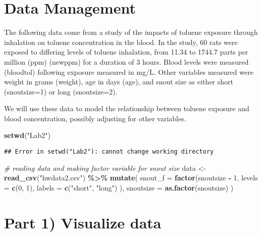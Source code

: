 \documentclass[
]{article}
\newenvironment{Shaded}{\begin{snugshade}}{\end{snugshade}}
\newcommand{\AttributeTok}[1]{\textcolor[rgb]{0.13,0.29,0.53}{#1}}
\newcommand{\CommentTok}[1]{\textcolor[rgb]{0.56,0.35,0.01}{\textit{#1}}}
\newcommand{\DecValTok}[1]{\textcolor[rgb]{0.00,0.00,0.81}{#1}}
\newcommand{\FunctionTok}[1]{\textcolor[rgb]{0.13,0.29,0.53}{\textbf{#1}}}
\newcommand{\NormalTok}[1]{#1}
\newcommand{\OtherTok}[1]{\textcolor[rgb]{0.56,0.35,0.01}{#1}}
\newcommand{\SpecialCharTok}[1]{\textcolor[rgb]{0.81,0.36,0.00}{\textbf{#1}}}
\newcommand{\StringTok}[1]{\textcolor[rgb]{0.31,0.60,0.02}{#1}}
\begin{document}
\section{Data Management}\label{data-management}

The following data come from a study of the impacts of toluene exposure
through inhalation on toluene concentration in the blood. In the study,
60 rats were exposed to differing levels of toluene inhalation, from
11.34 to 1744.7 parts per million (ppm) (newppm) for a duration of 3
hours. Blood levels were measured (bloodtol) following exposure measured
in mg/L. Other variables measured were weight in grams (weight), age in
days (age), and snout size as either short (snoutsize=1) or long
(snoutsize=2).

We will use these data to model the relationship between toluene
exposure and blood concentration, possibly adjusting for other
variables.

\begin{Shaded}
\begin{Highlighting}[]
\FunctionTok{setwd}\NormalTok{(}\StringTok{"Lab2"}\NormalTok{)}
\end{Highlighting}
\end{Shaded}

\begin{verbatim}
## Error in setwd("Lab2"): cannot change working directory
\end{verbatim}

\begin{Shaded}
\begin{Highlighting}[]
\CommentTok{\# reading data and making factor variable for snout size}
\NormalTok{data }\OtherTok{\textless{}{-}} \FunctionTok{read\_csv}\NormalTok{(}\StringTok{"hwdata2.csv"}\NormalTok{) }\SpecialCharTok{\%\textgreater{}\%}
  \FunctionTok{mutate}\NormalTok{(}
    \AttributeTok{snout\_f =} \FunctionTok{factor}\NormalTok{(snoutsize }\SpecialCharTok{{-}} \DecValTok{1}\NormalTok{,}
      \AttributeTok{levels =} \FunctionTok{c}\NormalTok{(}\DecValTok{0}\NormalTok{, }\DecValTok{1}\NormalTok{),}
      \AttributeTok{labels =} \FunctionTok{c}\NormalTok{(}\StringTok{"short"}\NormalTok{, }\StringTok{"long"}\NormalTok{)}
\NormalTok{    ),}
    \AttributeTok{snoutsize =} \FunctionTok{as.factor}\NormalTok{(snoutsize)}
\NormalTok{  )}
\end{Highlighting}
\end{Shaded}

\section{Part 1) Visualize data}\label{part-1-visualize-data}
\end{document}
